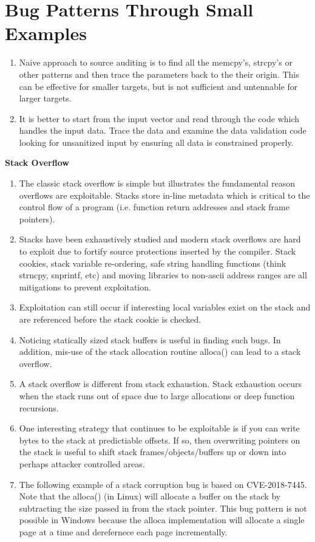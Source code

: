 \documentclass[12pt]{Training}
\begin{document}
\section*{Bug Patterns Through Small Examples}
\begin{enumerate}
	\item Naive approach to source auditing is to find all the memcpy's, strcpy's or other patterns and then trace the parameters back to the their origin. This can be effective for smaller targets, but is not sufficient and untennable for larger targets.
	\item It is better to start from the input vector and read through the code which handles the input data. Trace the data and examine the data validation code looking for unsanitized input by ensuring all data is constrained properly.
\end{enumerate}

\textbf{Stack Overflow}
\begin{enumerate}
	\item The classic stack overflow is simple but illustrates the fundamental reason overflows are exploitable. Stacks store in-line metadata which is critical to the control flow of a program (i.e. function return addresses and stack frame pointers).
	\item Stacks have been exhaustively studied and modern stack overflows are hard to exploit due to fortify source protections inserted by the compiler. Stack cookies, stack variable re-ordering, safe string handling functions (think strncpy, snprintf, etc) and moving libraries to non-ascii address ranges are all mitigations to prevent exploitation.
	\item Exploitation can still occur if interesting local variables exist on the stack and are referenced before the stack cookie is checked.
	\item Noticing statically sized stack buffers is useful in finding such bugs. In addition, mis-use of the stack allocation routine alloca() can lead to a stack overflow.
	\item A stack overflow is different from stack exhaustion. Stack exhaustion occurs when the stack runs out of space due to large allocations or deep function recursions.
	\item One interesting strategy that continues to be exploitable is if you can write bytes to the stack at predictiable offsets. If so, then overwriting pointers on the stack is useful to shift stack frames/objects/buffers up or down into perhaps attacker controlled areas.
	\item The following example of a stack corruption bug is based on CVE-2018-7445. Note that the alloca() (in Linux) will allocate a buffer on the stack by subtracting the size passed in from the stack pointer. This bug pattern is not possible in Windows because the alloca implementation will allocate a single page at a time and derefernece each page incrementally.
\end{enumerate}
\end{document}
